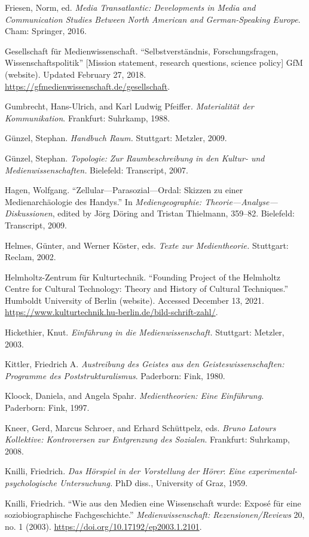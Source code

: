 \documentclass{tufte-handout}
\begin{document}
\begin{hangparas}{.25in}{1}
Friesen, Norm, ed. \emph{Media Transatlantic: Developments in Media and
Communication Studies Between North American and German-Speaking
Europe}. Cham: Springer, 2016.

Gesellschaft für Medienwissenschaft. ``Selbstverständnis,
Forschungsfragen, Wissenschaftspolitik'' {[}Mission statement, research
questions, science policy{]} GfM (website). Updated February 27, 2018.
\url{https://gfmedienwissenschaft.de/gesellschaft}.

Gumbrecht, Hans-Ulrich, and Karl Ludwig Pfeiffer. \emph{Materialität der
Kommunikation}. Frankfurt: Suhrkamp, 1988.

Günzel, Stephan. \emph{Handbuch Raum.} Stuttgart: Metzler, 2009.

Günzel, Stephan. \emph{Topologie:} \emph{Zur Raumbeschreibung in den
Kultur- und Medienwissenschaften.} Bielefeld: Transcript, 2007.

Hagen, Wolfgang. ``Zellular---Parasozial---Ordal: Skizzen zu einer
Medienarchäologie des Handys.'' In \emph{Mediengeographie:
Theorie---Analyse---Diskussionen}, edited by Jörg Döring and Tristan
Thielmann, 359--82. Bielefeld: Transcript, 2009.

Helmes, Günter, and Werner Köster, eds. \emph{Texte zur Medientheorie.}
Stuttgart: Reclam, 2002.

Helmholtz-Zentrum für Kulturtechnik. ``Founding Project of the Helmholtz
Centre for Cultural Technology: Theory and History of Cultural
Techniques.'' Humboldt University of Berlin (website). Accessed December
13, 2021.
\url{https://www.kulturtechnik.hu-berlin.de/bild-schrift-zahl/}.

Hickethier, Knut. \emph{Einführung in die Medienwissenschaft.}
Stuttgart: Metzler, 2003.

Kittler, Friedrich A. \emph{Austreibung des Geistes aus den
Geisteswissenschaften: Programme des Poststrukturalismus}. Paderborn:
Fink, 1980.

Kloock, Daniela, and Angela Spahr. \emph{Medientheorien: Eine
Einführung.} Paderborn: Fink, 1997.

Kneer, Gerd, Marcus Schroer, and Erhard Schüttpelz, eds. \emph{Bruno
Latours Kollektive: Kontroversen zur Entgrenzung des Sozialen}.
Frankfurt: Suhrkamp, 2008.

Knilli, Friedrich. \emph{Das Hörspiel in der Vorstellung der Hörer}:
\emph{Eine experimental-psychologische Untersuchung.} PhD diss.,
University of Graz, 1959.

Knilli, Friedrich. ``Wie aus den Medien eine Wissenschaft wurde: Exposé
für eine soziobiographische Fachgeschichte.'' \emph{Medienwissenschaft:
Rezensionen/Reviews} 20, no. 1 (2003).
\url{https://doi.org/10.17192/ep2003.1.2101}.


\end{hangparas}
\end{document}
